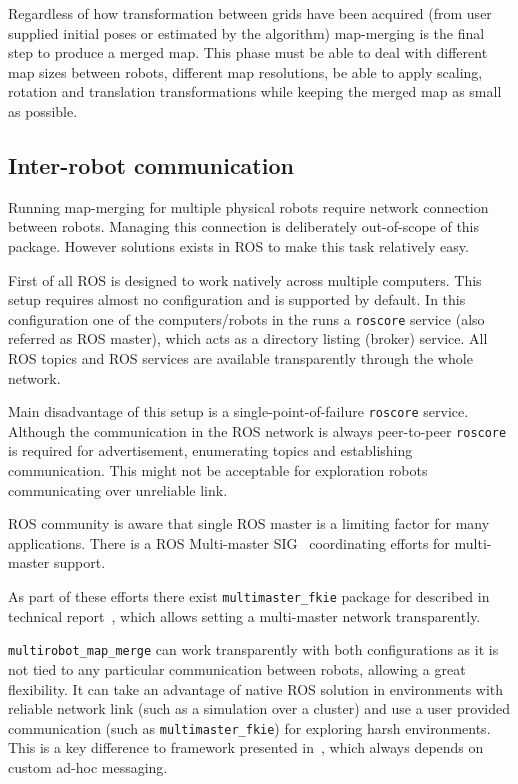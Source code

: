 Regardless of how transformation between grids have been acquired (from user supplied initial poses or estimated by the algorithm) map-merging is the final step to produce a merged map. This phase must be able to deal with different map sizes between robots, different map resolutions, be able to apply scaling, rotation and translation transformations while keeping the merged map as small as possible.

\subsection{Inter-robot communication}

Running map-merging for multiple physical robots require network connection between robots. Managing this connection is deliberately out-of-scope of this package. However solutions exists in \gls{ROS} to make this task relatively easy.

First of all \gls{ROS} is designed to work natively across multiple computers. This setup requires almost no configuration and is supported by default. In this configuration one of the computers/robots in the runs a \texttt{roscore} service (also referred as \gls{ROS} master), which acts as a directory listing (broker) service. All \gls{ROS} topics and \gls{ROS} services are available transparently through the whole network.

Main disadvantage of this setup is a single-point-of-failure \texttt{roscore} service. Although the communication in the \gls{ROS} network is always peer-to-peer \texttt{roscore} is required for advertisement, enumerating topics and establishing communication. This might not be acceptable for exploration robots communicating over unreliable link.

\gls{ROS} community is aware that single \gls{ROS} master is a limiting factor for many applications. There is a \gls{ROS} Multi-master \gls{SIG}~\cite{MultiMasterSIG} coordinating efforts for multi-master support.

As part of these efforts there exist \texttt{multimaster\_fkie} package for described in technical report~\cite{herrero2015multimaster}, which allows setting a multi-master network transparently.

\texttt{multirobot\_map\_merge} can work transparently with both configurations as it is not tied to any particular communication between robots, allowing a great flexibility. It can take an advantage of native \gls{ROS} solution in environments with reliable network link (such as a simulation over a cluster) and use a user provided communication (such as \texttt{multimaster\_fkie}) for exploring harsh environments. This is a key difference to framework presented in~\cite{Andre2014}, which always depends on custom ad-hoc messaging.

